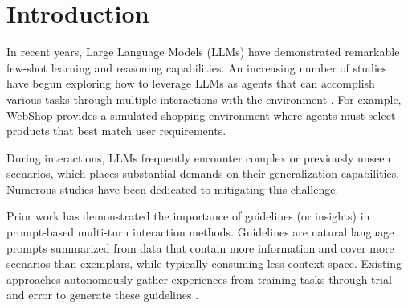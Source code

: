 \section{Introduction}


In recent years, Large Language Models (LLMs) \cite{Ouyang-Long-NeurIPS-2022-InstructGPT,OpenAI-2023-GPT4} have demonstrated remarkable few-shot learning and reasoning capabilities. An increasing number of studies have begun exploring how to leverage LLMs as agents that can accomplish various tasks through multiple interactions with the environment \cite{deng-2023-mindweb,liu-2024-ICLR-agentbench,Wang-2024-agentsurvey}. For example, WebShop \cite{Yao-Shunyu-NeurIPS-2022-WebShop} provides a simulated shopping environment where agents must select products that best match user requirements.

During interactions, LLMs frequently encounter complex or previously unseen scenarios, which places substantial demands on their generalization capabilities. Numerous studies have been dedicated to mitigating this challenge.

% 

Prior work has demonstrated the importance of guidelines (or insights) in prompt-based multi-turn interaction methods. 
Guidelines are natural language prompts summarized from data that contain more information and cover more scenarios than exemplars, while typically consuming less context space. 
Existing approaches autonomously gather experiences from training tasks through trial and error to generate these guidelines \cite{Zhao-Andrew-AAAI-2024-ExpeL}.

